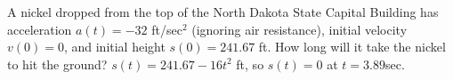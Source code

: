{A nickel dropped from the top of the North Dakota State Capital Building has acceleration $a(t)=-32$ ft/sec$^2$ (ignoring air resistance), initial velocity $v(0)=0$, and initial height $s(0)=241.67$ ft. How long will it take the nickel to hit the ground?}
{$s(t)=241.67-16t^2$ ft, so $s(t)=0$ at $t=3.89$sec.}

